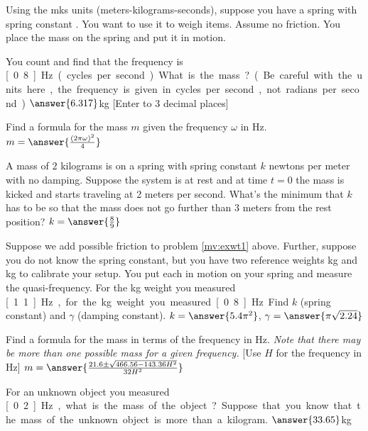 \documentclass{ximera}
\begin{document}
\begin{exercise} \label{mv:exwt1}
    Using the mks units (meters-kilograms-seconds), suppose you have a spring with spring constant . You want to use it to weigh items.  Assume no friction.  You place the mass on the spring and put it in motion. 
    
    You count and find that the frequency is \unit[0.8]{Hz} (cycles per second).  What is the mass? (Be careful with the units here, the frequency is given in cycles per second, not radians per second.)
    $\answer{6.317}$kg [Enter to 3 decimal places]
    \begin{problem}
        Find a formula for the mass $m$ given the frequency $\omega$ in \unit{Hz}. $m = \answer{\frac{(2\pi \omega)^2}{4}}$
    \end{problem}
\end{exercise}

\begin{exercise}%
    A mass of $2$ kilograms is on a spring with spring constant $k$ newtons per meter with no damping.  Suppose the system is at rest and at time $t=0$ the mass is kicked and starts traveling at 2 meters per second.  What's the minimum that $k$ has to be so that the mass does not go further than 3 meters from the rest position? $k = \answer{\frac{8}{9}}$
\end{exercise}

\begin{exercise}
    Suppose we add possible friction to problem \ref{mv:exwt1} above. Further, suppose you do not know the spring constant, but you have two reference weights \unit[1]{kg} and \unit[2]{kg} to calibrate your setup. You put each in motion on your spring and measure the quasi-frequency.  For the \unit[1]{kg} weight you measured \unit[1.1]{Hz}, for the \unit[2]{kg} weight you measured \unit[0.8]{Hz}.
    
    Find $k$ (spring constant) and $\gamma$ (damping constant). $k = \answer{5.4\pi^2}$, $\gamma = \answer{\pi\sqrt{2.24}}$
    \begin{problem}
        Find a formula for the mass in terms of the frequency in Hz.  \emph{Note that there may be more than one possible mass for a given frequency.} [Use $H$ for the frequency in Hz] $m = \answer{\frac{21.6 \pm \sqrt{466.56 - 143.36H^2}}{32H^2}}$
        \begin{problem}
            For an unknown object you measured \unit[0.2]{Hz}, what is the mass of the object?  Suppose that you know that the mass of the unknown object is more than a kilogram. $\answer{33.65}$kg
        \end{problem}
    \end{problem}
\end{exercise}
\end{document}
